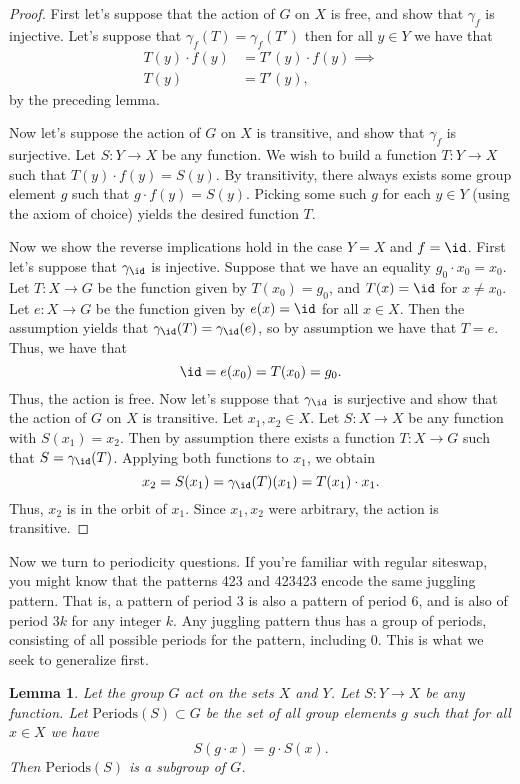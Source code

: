 \documentclass[12nt]{article}
\theoremstyle{plain}
\newtheorem{lemma}{Lemma}
\begin{document}
\begin{proof}
First let's suppose that the action of $G$ on $X$ is free, and show that $\gamma_f$ is injective. Let's suppose that $\gamma_f(T) = \gamma_f(T')$ then for all $y \in Y$ we have that 
\begin{align*}
T(y) \cdot f(y) &= T'(y) \cdot f(y) \implies \\
T(y) &= T'(y),
\end{align*}
by the preceding lemma.

Now let's suppose the action of $G$ on $X$ is transitive, and show that $\gamma_f$ is surjective. Let $S : Y \to X$ be any function. We wish to build a function $T : Y \to X$ such that $T(y) \cdot f(y) = S(y)$. By transitivity, there always exists some group element $g$ such that $g \cdot f(y) = S(y)$. Picking some such $g$ for each $y \in Y$ (using the axiom of choice) yields the desired function $T$. 

Now we show the reverse implications hold in the case $Y = X$ and $f = \id$. First let's suppose that $\gamma_{\id}$ is injective. Suppose that we have an equality $g_0 \cdot x_0 = x_0$. Let $T : X \to G$ be the function given by $T(x_0) = g_0$, and $T(x) = \id$ for $x \neq x_0$. Let $e : X \to G$ be the function given by $e(x) = \id$ for all $x \in X$. Then the assumption yields that $\gamma_{\id}(T) = \gamma_{\id}(e)$, so by assumption we have that $T = e$. Thus, we have that
\[
\id = e(x_0) = T(x_0) = g_0.
\]
Thus, the action is free. Now let's suppose that $\gamma_{\id}$ is surjective and show that the action of $G$ on $X$ is transitive. Let $x_1, x_2 \in X$. Let $S : X \to X$ be any function with $S(x_1) = x_2$. Then by assumption there exists a function $T : X \to G$ such that $S = \gamma_{\id}(T)$. Applying both functions to $x_1$, we obtain
\[
x_2 = S(x_1) = \gamma_{\id}(T)(x_1) = T(x_1) \cdot x_1.
\]
Thus, $x_2$ is in the orbit of $x_1$. Since $x_1, x_2$ were arbitrary, the action is transitive.
\end{proof}


Now we turn to periodicity questions. If you're familiar with regular siteswap, you might know that the patterns 423 and 423423 encode the same juggling pattern. That is, a pattern of period 3 is also a pattern of period 6, and is also of period $3k$ for any integer $k$. Any juggling pattern thus has a group of periods, consisting of all possible periods for the pattern, including 0. This is what we seek to generalize first. 

\begin{lemma}
Let the group $G$ act on the sets $X$ and $Y$. Let $S : Y \to X$ be any function. Let $\text{Periods}(S) \subset G$ be the set of all group elements $g$ such that for all $x \in X$ we have
\[
S(g \cdot x) = g \cdot S(x).
\]
Then $\text{Periods}(S)$ is a subgroup of $G$.
\end{lemma}
\end{document}
